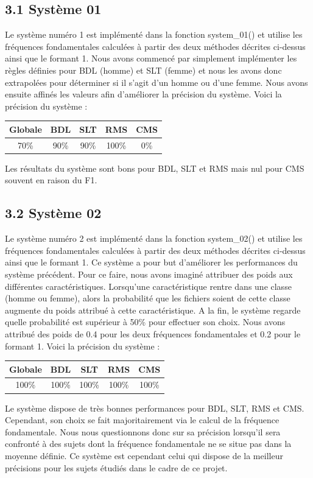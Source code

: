 \documentclass[a4paper,12pt]{report}	%
\begin{document}
{\subsection*{3.1 Système 01}}
Le système numéro 1 est implémenté dans la fonction system\_01() et utilise les fréquences fondamentales calculées à partir des deux méthodes décrites ci-dessus ainsi que le formant 1. Nous avons commencé par simplement implémenter les règles définies pour BDL (homme) et SLT (femme) et nous les avons donc extrapolées pour déterminer si il s'agit d'un homme ou d'une femme. Nous avons ensuite affinés les valeurs afin d'améliorer la précision du système. Voici la précision du système : \\
\begin{center}
	\begin{tabular}{|c|c|c|c|c|}
		\hline
		Globale & BDL & SLT & RMS & CMS \\
		\hline
		70\% & 90\% & 90\% & 100\% & 0\% \\
		\hline
		\end{tabular}
\end{center}
Les résultats du système sont bons pour BDL, SLT et RMS mais nul pour CMS souvent en raison du F1.
{\subsection*{3.2 Système 02}}
Le système numéro 2 est implémenté dans la fonction system\_02() et utilise les fréquences fondamentales calculées à partir des deux méthodes décrites ci-dessus ainsi que le formant 1. Ce système a pour but d'améliorer les performances du système précédent. Pour ce faire, nous avons imaginé attribuer des poids aux différentes caractéristiques. Lorsqu'une caractéristique rentre dans une classe (homme ou femme), alors la probabilité que les fichiers soient de cette classe augmente du poids attribué à cette caractéristique. A la fin, le système regarde quelle probabilité est supérieur à 50\% pour effectuer son choix. Nous avons attribué des poids de 0.4 pour les deux fréquences fondamentales et 0.2 pour le formant 1. Voici la précision du système : \\
\begin{center}
	\begin{tabular}{|c|c|c|c|c|}
		\hline
		Globale & BDL & SLT & RMS & CMS \\
		\hline
		100\% & 100\% & 100\% & 100\% & 100\% \\
		\hline
	\end{tabular}
\end{center}
Le système dispose de très bonnes performances pour BDL, SLT, RMS et CMS. Cependant, son choix se fait majoritairement via le calcul de la fréquence fondamentale. Nous nous questionnons donc sur sa précision lorsqu'il sera confronté à des sujets dont la fréquence fondamentale ne se situe pas dans la moyenne définie. Ce système est cependant celui qui dispose de la meilleur précisions pour les sujets étudiés dans le cadre de ce projet.
\end{document}
